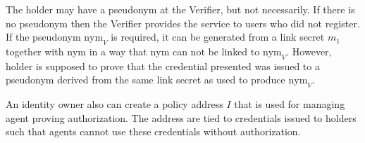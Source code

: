The holder may have a pseudonym at the Verifier, but not necessarily. If there is no pseudonym then the Verifier provides the service to users who did not register. If the pseudonym $\mathrm{nym}_V$ is required, it can be generated from a link secret $m_1$ together with $\mathrm{nym}$ in a way that $\mathrm{nym}$ can not be linked to $\mathrm{nym}_V$. However, holder is supposed to prove that the credential presented was issued to a pseudonym derived from the same link secret as used to produce $\mathrm{nym}_V$.

An identity owner also can create a policy address $I$ that is used for managing agent proving authorization. The address are tied to credentials issued to holders such that agents cannot use these credentials without authorization.

\begin{comment}

\section{Simple example}

 Government (Issuer $G$) issues credentials with age and photo hash. Company ABC-Co (Issuer $A$) issues a credential that includes start-date and employment status, e.g., 'FULL-TIME'.
 
Holder establishes a pseudonym with both issuers. Then he got two credentials independently. After that he proves
to Verifier that he has two credentials such that
\begin{itemize}
\item The same link secret is used in both credentials;
\item The age value in the first credential is over 20;
\item The employment status is 'FULL-TIME'.
\end{itemize}

Steps in Section~\ref{sec:iss-setup} must be executed for each issuer.

Issuer and holder mutually trust each other in submitting values of the right format
during credential's issuance. This trust can be eliminated at the cost of some extra steps.

\subsection{Functionality}

In this description of the protocol, holder has two attributes he hides from issuer -- his link secret and policy address. However, the protocol allows for any number of attributes to be hidden from issuers.
\end{comment}

